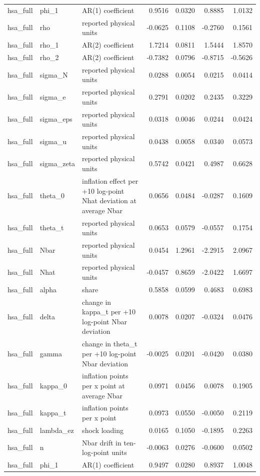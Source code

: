 \begin{tabular}{lllrrrr}
hsa\_full & phi\_1 & AR(1) coefficient & 0.9516 & 0.0320 & 0.8885 & 1.0132 \\
hsa\_full & rho & reported physical units & -0.0625 & 0.1108 & -0.2760 & 0.1561 \\
hsa\_full & rho\_1 & AR(2) coefficient & 1.7214 & 0.0811 & 1.5444 & 1.8570 \\
hsa\_full & rho\_2 & AR(2) coefficient & -0.7382 & 0.0796 & -0.8715 & -0.5626 \\
hsa\_full & sigma\_N & reported physical units & 0.0288 & 0.0054 & 0.0215 & 0.0414 \\
hsa\_full & sigma\_e & reported physical units & 0.2791 & 0.0202 & 0.2435 & 0.3229 \\
hsa\_full & sigma\_eps & reported physical units & 0.0318 & 0.0046 & 0.0244 & 0.0424 \\
hsa\_full & sigma\_u & reported physical units & 0.0438 & 0.0058 & 0.0340 & 0.0573 \\
hsa\_full & sigma\_zeta & reported physical units & 0.5742 & 0.0421 & 0.4987 & 0.6628 \\
hsa\_full & theta\_0 & inflation effect per +10 log-point Nhat deviation at average Nbar & 0.0656 & 0.0484 & -0.0287 & 0.1609 \\
hsa\_full & theta\_t & reported physical units & 0.0653 & 0.0579 & -0.0557 & 0.1754 \\
hsa\_full & Nbar & reported physical units & 0.0454 & 1.2961 & -2.2915 & 2.0967 \\
hsa\_full & Nhat & reported physical units & -0.0457 & 0.8659 & -2.0422 & 1.6697 \\
hsa\_full & alpha & share & 0.5858 & 0.0599 & 0.4683 & 0.6983 \\
hsa\_full & delta & change in kappa\_t per +10 log-point Nbar deviation & 0.0078 & 0.0207 & -0.0324 & 0.0476 \\
hsa\_full & gamma & change in theta\_t per +10 log-point Nbar deviation & -0.0025 & 0.0201 & -0.0420 & 0.0380 \\
hsa\_full & kappa\_0 & inflation points per x point at average Nbar & 0.0971 & 0.0456 & 0.0078 & 0.1905 \\
hsa\_full & kappa\_t & inflation points per x point & 0.0973 & 0.0550 & -0.0050 & 0.2119 \\
hsa\_full & lambda\_ez & shock loading & 0.0165 & 0.1050 & -0.1895 & 0.2263 \\
hsa\_full & n & Nbar drift in ten-log-point units & -0.0063 & 0.0276 & -0.0600 & 0.0502 \\
hsa\_full & phi\_1 & AR(1) coefficient & 0.9497 & 0.0280 & 0.8937 & 1.0048 \\

\end{tabular}
